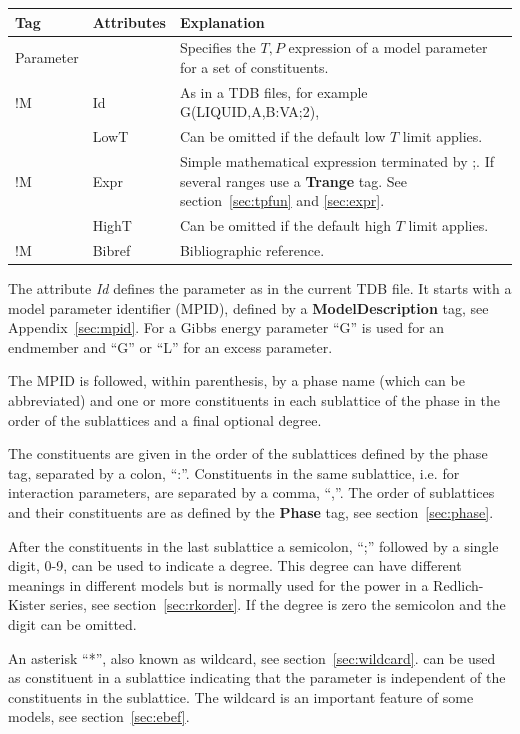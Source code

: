 \documentclass{article}
\begin{document}
\bigskip
\begin{tabular}{|p{} p{} p{}|}\hline
  Tag & Attributes & Explanation\\\hline

  Parameter & & Specifies the $T, P$ expression of a model parameter for a set of constituents.\\
!M      & Id & As in a TDB files, for example G(LIQUID,A,B:VA;2), \\
      & LowT & Can be omitted if the default low $T$ limit applies.\\
!M      & Expr & Simple mathematical expression terminated by ;.  If several ranges use a {\bf Trange} tag.  See section~\ref{sec:tpfun} and \ref{sec:expr}.\\
      & HighT & Can be omitted if the default high $T$ limit applies.\\
!M     & Bibref & Bibliographic reference.\\\hline
\end{tabular}

The attribute {\em Id} defines the parameter as in the current TDB
file.  It starts with a model parameter identifier (MPID), defined by
a {\bf ModelDescription} tag, see Appendix~\ref{sec:mpid}.  For a
Gibbs energy parameter ``G'' is used for an endmember and ``G'' or ``L''
for an excess parameter.

The MPID is followed, within parenthesis, by a phase name (which can
be abbreviated) and one or more constituents in each sublattice of the
phase in the order of the sublattices and a final optional degree.

The constituents are given in the order of the sublattices defined by the
phase tag, separated by a colon, ``:''.  Constituents in the same
sublattice, i.e.  for interaction parameters, are separated by a
comma, ``,''.  The order of sublattices and their constituents are as
defined by the {\bf Phase} tag, see section~\ref{sec:phase}.

After the constituents in the last sublattice a semicolon, ``;''
followed by a single digit, 0-9, can be used to indicate a degree.
This degree can have different meanings in different models but is
normally used for the power in a Redlich-Kister series, see
section~\ref{sec:rkorder}.  If the degree is zero the semicolon and
the digit can be omitted.

An asterisk ``*'', also known as wildcard, see
section~\ref{sec:wildcard}. can be used as constituent in a sublattice
indicating that the parameter is independent of the constituents in
the sublattice.  The wildcard is an important feature of some models,
see section~\ref{sec:ebef}.
\end{document}
